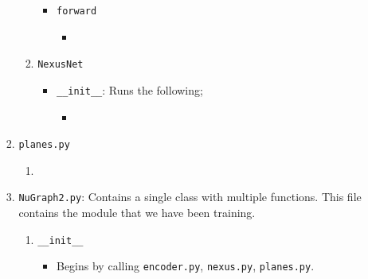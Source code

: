 \begin{itemize}
\begin{enumerate}
\begin{enumerate}
\begin{enumerate}
\begin{itemize}
                                    \item \texttt{forward}
                                        \begin{itemize}
                                            \item 
                                        \end{itemize}
                                \end{itemize}

                            \item \texttt{NexusNet}
                                \begin{itemize} 
                                    \item \texttt{\_\_init\_\_}: Runs the following;
                                        \begin{itemize}
                                            \item \texttt{}
                                        \end{itemize}
                                \end{itemize}
                        \end{enumerate}

                    \item \texttt{planes.py}
                        \begin{enumerate}
                            \item
                        \end{enumerate}

                    \item \texttt{NuGraph2.py}: Contains a single class with multiple functions. This file contains the module that we have been training.
                        \begin{enumerate}
                            \item \texttt{\_\_init\_\_}
                            \begin{itemize}
                                \item Begins by calling \texttt{encoder.py}, \texttt{nexus.py}, \texttt{planes.py}.
                            \end{itemize}
                        \end{enumerate}

                \end{enumerate}
        \end{enumerate}
\end{itemize}
